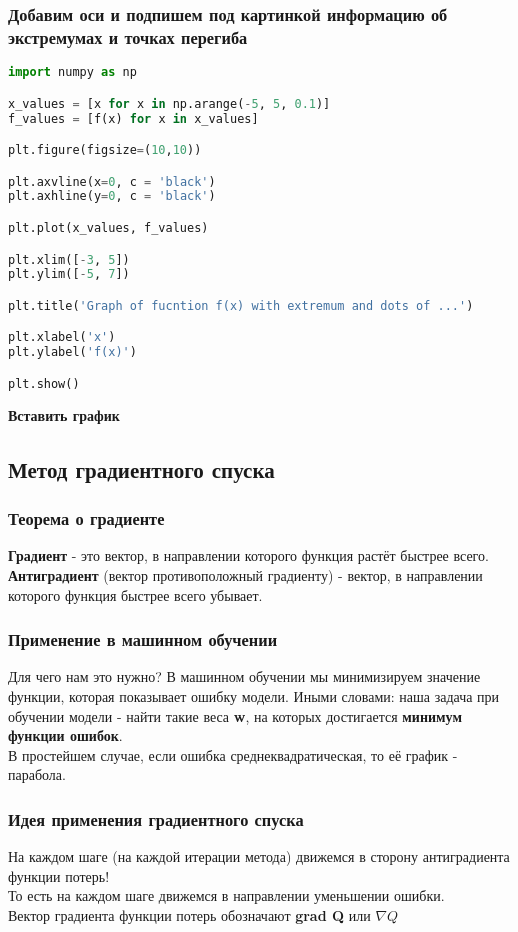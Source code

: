 \documentclass{article}
\theoremstyle{problemstyle}
\theoremstyle{ans}
\begin{document}
\subsubsection{Добавим оси и подпишем под картинкой информацию об экстремумах и точках перегиба}
\begin{lstlisting}[language=python]
import numpy as np

x_values = [x for x in np.arange(-5, 5, 0.1)]
f_values = [f(x) for x in x_values] 

plt.figure(figsize=(10,10))

plt.axvline(x=0, c = 'black')
plt.axhline(y=0, c = 'black')

plt.plot(x_values, f_values)

plt.xlim([-3, 5])
plt.ylim([-5, 7])

plt.title('Graph of fucntion f(x) with extremum and dots of ...')

plt.xlabel('x')
plt.ylabel('f(x)')

plt.show()
\end{lstlisting}
\textbf{Вставить график}

\subsection{Метод градиентного спуска}
\subsubsection{Теорема о градиенте}
\textbf{Градиент} - это вектор, в направлении которого функция растёт быстрее всего.\\
\textbf{Антиградиент} (вектор противоположный градиенту) - вектор, в направлении которого функция быстрее всего убывает.\\
\subsubsection{Применение в машинном обучении}
Для чего нам это нужно? В машинном обучении мы минимизируем значение функции, которая показывает ошибку модели. Иными словами: наша задача при обучении модели - найти такие веса \textbf{w}, на которых достигается  \textbf{минимум функции ошибок}.\\
В простейшем случае, если ошибка среднеквадратическая, то её график - парабола.\\
\subsubsection{Идея применения градиентного спуска}
На каждом шаге (на каждой итерации метода) движемся в сторону антиградиента функции потерь!\\
То есть на каждом шаге движемся в направлении уменьшении ошибки.\\
Вектор градиента функции потерь обозначают \textbf{grad Q} или \textbf{$\nabla Q$}
\end{document}
